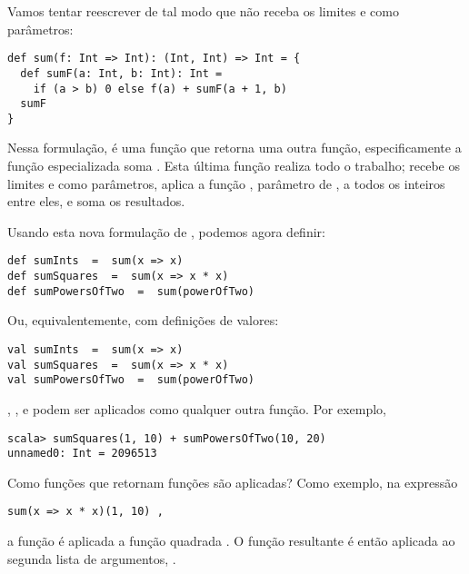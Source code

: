 Vamos tentar reescrever  de tal modo que n\~{a}o receba os limites
 e  como par\^{a}metros:     

\begin{lstlisting}
def sum(f: Int => Int): (Int, Int) => Int = {
  def sumF(a: Int, b: Int): Int =
    if (a > b) 0 else f(a) + sumF(a + 1, b)
  sumF
}
\end{lstlisting}

Nessa formula\c{c}\~{a}o,  \'{e} uma fun\c{c}\~{a}o que retorna uma outra fun\c{c}\~{a}o, especificamente
a fun\c{c}\~{a}o especializada soma . Esta \'{u}ltima fun\c{c}\~{a}o realiza todo o trabalho; 
recebe os limites  e  como par\^{a}metros, aplica a fun\c{c}\~{a}o , par\^{a}metro
de , a todos os inteiros entre eles, e soma os resultados.
      
Usando esta nova formula\c{c}\~{a}o de , podemos agora definir:
\begin{lstlisting}
def sumInts  =  sum(x => x)
def sumSquares  =  sum(x => x * x)
def sumPowersOfTwo  =  sum(powerOfTwo)
\end{lstlisting}
Ou, equivalentemente, com defini\c{c}\~{o}es de valores:
\begin{lstlisting}
val sumInts  =  sum(x => x)
val sumSquares  =  sum(x => x * x)
val sumPowersOfTwo  =  sum(powerOfTwo)
\end{lstlisting}

 , , e  podem ser
aplicados como qualquer outra fun\c{c}\~{a}o. Por exemplo,
\begin{lstlisting}
scala> sumSquares(1, 10) + sumPowersOfTwo(10, 20)
unnamed0: Int = 2096513
\end{lstlisting}
Como fun\c{c}\~{o}es que retornam fun\c{c}\~{o}es s\~{a}o aplicadas? Como exemplo, na express\~{a}o 
\begin{lstlisting}
sum(x => x * x)(1, 10) ,
\end{lstlisting}
a fun\c{c}\~{a}o  \'{e} aplicada a fun\c{c}\~{a}o quadrada . 
O fun\c{c}\~{a}o resultante \'{e} ent\~{a}o aplicada ao segunda lista de argumentos, .   

